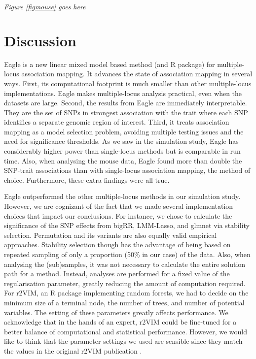 \documentclass{nature}
\begin{document}
{\em Figure \ref{figmouse} goes here}




 
\section{Discussion}
Eagle is a new linear mixed model based method (and R package) for multiple-locus association mapping. It advances the state of association mapping in several ways. 
First, its computational footprint is much smaller than other multiple-locus implementations. Eagle makes multiple-locus analysis 
practical, even when the datasets are large. Second, the results from
 Eagle are immediately interpretable. They are the set of SNPs in strongest association with the trait where 
each SNP identifies a separate genomic region of interest. Third, it treats association mapping as a model selection problem, avoiding 
multiple testing issues and the need for significance thresholds. 
 As we saw in the simulation study, Eagle has considerably higher power than single-locus methods but is comparable in run time.
Also, when analysing the mouse data, Eagle found more than double the SNP-trait associations than 
with single-locus association mapping, the method of choice. Furthermore, these extra findings were all true. 

Eagle outperformed the other multiple-locus methods in our simulation study. However, we are cognizant of the fact  that we made several implementation 
choices that impact our conclusions.  For instance, we chose to calculate the significance of the 
SNP effects from bigRR, LMM-Lasso, and glmnet via stability selection.  Permutation and its variants \cite{ browning2008presto,pahl2010permory} are also equally valid empirical approaches. Stability selection though has the advantage of being based on repeated sampling of only a proportion (50\% in our case) of the 
data. Also, when analysing the (sub)samples, it was not necessary to calculate the entire solution path for a method. 
 Instead,  analyses are 
performed for a fixed value of the regularisation parameter, greatly reducing the amount of computation required. For r2VIM, an R package 
implementing random forests, we had to decide on the  minimum size of a terminal node, the number of trees, and number of potential variables. 
The setting of these parameters greatly affects performance.  We  acknowledge that in the hands of an expert, 
r2VIM could be fine-tuned for a better balance of computational and statistical performance. 
However, we would like to think that the parameter settings we used are sensible 
since they match the values in the original r2VIM publication \cite{szymczak2016r2vim}.
\end{document}
